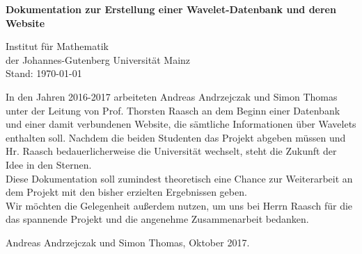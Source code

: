 \documentclass[11pt,a4paper,titlepage]{article}
\theoremstyle{plain} %
\theoremstyle{definition} %
\numberwithin{equation}{section} %
\begin{document}
	\noindent
	\parindent0pt %
	\begin{center}
  		\huge{\textbf{Dokumentation zur Erstellung einer Wavelet-Datenbank und deren Website}} \\
 	
    
    	\vspace{0.5cm}
 

		\large{Institut für Mathematik \\
	 	der Johannes-Gutenberg Universität Mainz\\
	 	Stand: \today }

		\vspace*{0.5cm}
	\end{center}
		In den Jahren 2016-2017 arbeiteten Andreas Andrzejczak und Simon Thomas unter der Leitung von Prof. Thorsten Raasch an dem Beginn einer Datenbank und einer damit verbundenen Website, die sämtliche Informationen über Wavelets enthalten soll. Nachdem die beiden Studenten das Projekt abgeben müssen und Hr. Raasch bedauerlicherweise die Universität wechselt, steht die Zukunft der Idee in den Sternen.\\
		Diese Dokumentation soll zumindest theoretisch eine Chance zur Weiterarbeit an dem Projekt mit den bisher erzielten Ergebnissen geben.\\
		Wir möchten die Gelegenheit außerdem nutzen, um uns bei Herrn Raasch für die das spannende Projekt und die angenehme Zusammenarbeit bedanken.
		\begin{flushright}
			Andreas Andrzejczak und Simon Thomas, Oktober 2017.
		\end{flushright}
		

	\vspace*{0.2cm}
	\tableofcontents %
	\newpage


	
\end{document}
